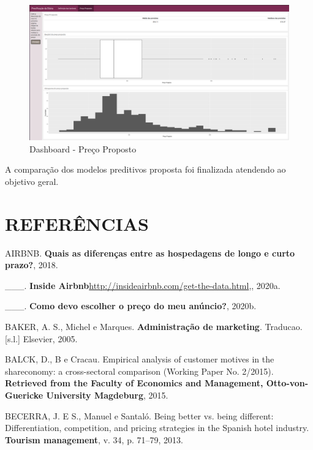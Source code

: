 \documentclass[
	12pt,				%
	a4paper,		%
	oneside,    %
	chapter=TITLE,		   %
	section=TITLE,		   %
	subsection=TITLE,	   %
	subsubsection=TITLE, %
	english,			%
	french,				%
	spanish,			%
	brazil,				%
]{abntex2}
\begin{document}
\begin{figure}
\centering
\includegraphics[width=\textwidth,height=0.3\textheight]{../fig/dash2.png}
\caption{Dashboard - Preço Proposto\label{fig:dash2}}
\end{figure}

A comparação dos modelos preditivos proposta foi finalizada atendendo ao
objetivo geral.

\newpage

\hypertarget{referuxeancias}{%
\chapter*{REFERÊNCIAS}\label{referuxeancias}}

\hypertarget{refs}{}
\leavevmode\hypertarget{ref-airbnbperiodolongo}{}%
AIRBNB. \textbf{Quais as diferenças entre as hospedagens de longo e
curto prazo?}, 2018.

\leavevmode\hypertarget{ref-inside}{}%
\_\_\_. \textbf{Inside
Airbnb}\url{http://insideairbnb.com/get-the-data.html},, 2020a.

\leavevmode\hypertarget{ref-precoairbnb}{}%
\_\_\_. \textbf{Como devo escolher o preço do meu anúncio?}, 2020b.

\leavevmode\hypertarget{ref-baker2005administraccao}{}%
BAKER, A. S., Michel e Marques. \textbf{Administração de marketing}.
Traducao. {[}s.l.{]} Elsevier, 2005.

\leavevmode\hypertarget{ref-balck2015empirical}{}%
BALCK, D., B e Cracau. Empirical analysis of customer motives in the
shareconomy: a cross-sectoral comparison (Working Paper No. 2/2015).
\textbf{Retrieved from the Faculty of Economics and Management,
Otto-von-Guericke University Magdeburg}, 2015.

\leavevmode\hypertarget{ref-becerra2013being}{}%
BECERRA, J. E S., Manuel e Santaló. Being better vs. being different:
Differentiation, competition, and pricing strategies in the Spanish
hotel industry. \textbf{Tourism management}, v. 34, p. 71--79, 2013.
\end{document}
